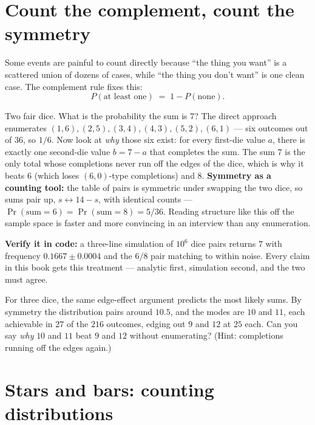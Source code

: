 \section{Count the complement, count the symmetry}\label{sec:complement}

Some events are painful to count directly because ``the thing you want'' is a scattered union of dozens of cases, while ``the thing you don't want'' is one clean case. The complement rule fixes this:
\[
P(\text{at least one}) \;=\; 1 - P(\text{none}).
\]

\begin{worked}
Two fair dice. What is the probability the sum is 7? The direct approach enumerates $(1,6), (2,5), (3,4), (4,3), (5,2), (6,1)$ --- six outcomes out of $36$, so $1/6$. Now look at \emph{why} those six exist: for every first-die value $a$, there is exactly one second-die value $b = 7 - a$ that completes the sum. The sum 7 is the only total whose completions never run off the edges of the dice, which is why it beats 6 (which loses $(6,0)$-type completions) and 8. \textbf{Symmetry as a counting tool:} the table of pairs is symmetric under swapping the two dice, so sums pair up, $s \leftrightarrow 14 - s$, with identical counts --- $\Pr(\text{sum} = 6) = \Pr(\text{sum} = 8) = 5/36$. Reading structure like this off the sample space is faster and more convincing in an interview than any enumeration.

\textbf{Verify it in code:} a three-line simulation of $10^6$ dice pairs returns $7$ with frequency $0.1667 \pm 0.0004$ and the $6/8$ pair matching to within noise. Every claim in this book gets this treatment --- analytic first, simulation second, and the two must agree.
\end{worked}

\begin{probe}
For three dice, the same edge-effect argument predicts the most likely sums. By symmetry the distribution pairs around $10.5$, and the modes are $10$ and $11$, each achievable in $27$ of the $216$ outcomes, edging out $9$ and $12$ at $25$ each. Can you say \emph{why} $10$ and $11$ beat $9$ and $12$ without enumerating? (Hint: completions running off the edges again.)
\end{probe}

\section{Stars and bars: counting distributions}

